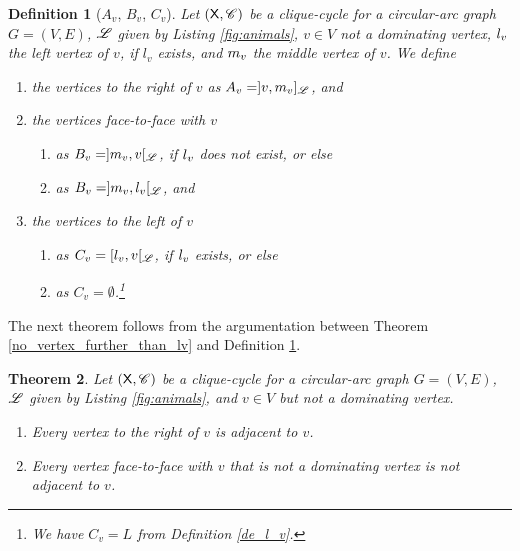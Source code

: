 \documentclass[10pt]{article}
\newtheorem{theorem}{Theorem}[section]
\newtheorem{definition}[theorem]{Definition}
\newcommand{\mvv}{\mv{v}}
\begin{document}
\begin{definition}[$A_v$, $B_v$, $C_v$]\label{leftrightface}
Let $(\mathsf{X},\mathscr{C})$ be a clique-cycle for a circular-arc graph $G=(V,E)$, $\mathscr{L}$ 
given by Listing \ref{fig:animals}, $v\in V$ not a dominating vertex, $l_{v}$ the left 
vertex of $v$, if $l_v$ exists, and $\mvv$ the middle vertex of $v$. We define
\begin{enumerate}
\item
the \emph{vertices to the right of $v$} 
as $A_v=]v,\mvv]_\ri{L}$, and 



\item
the \emph{vertices face-to-face with $v$}
\begin{enumerate}



\item
as $B_v=]\mvv,v[_\ri{L}$, if $l_{v}$ does not exist, or else

\item
as $B_v=]\mvv,\lvv[_\ri{L}$, and
\end{enumerate}
\item 
the \emph{vertices to the left of $v$}\begin{enumerate}

\item 
as $C_v=[l_{v},v[_{\mathscr{L}}$, if $l_{v}$ exists, or else

\item
as $C_v=\emptyset$.\footnote{
We have $C_v=L$ from Definition \ref{de_l_v}.
}
\end{enumerate}
\end{enumerate}
\end{definition}



The next theorem follows from the argumentation between 
Theorem \ref{no_vertex_further_than_lv} and Definition \ref{leftrightface}.

\begin{theorem}\label{Lvrl_v}
Let $(\mathsf{X},\mathscr{C})$ be a clique-cycle for a circular-arc graph $G=(V,E)$, $\mathscr{L}$ 
given by Listing \ref{fig:animals}, and $v\in V$ but not a dominating vertex.
\begin{enumerate}

\item \label{Lvrl_v1}
Every vertex to the right of $v$ is adjacent to $v$.

\item
Every vertex face-to-face with $v$ that is not a dominating vertex is not 
adjacent to $v$.
\end{enumerate}
\end{theorem}
\end{document}
